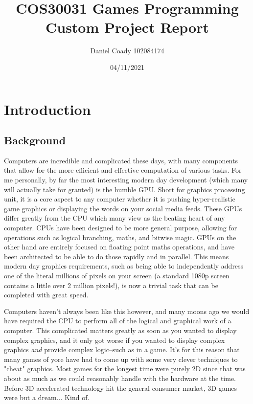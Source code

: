\documentclass{article}
\title{COS30031 Games Programming\\Custom Project Report}
\author{Daniel Coady 102084174}
\date{04/11/2021}
\begin{document}
\maketitle

\pagebreak

\tableofcontents

\pagebreak

\section{Introduction}
\subsection{Background}
Computers are incredible and complicated these days, with many components that
allow for the more efficient and effective computation of various tasks. For me
personally, by far the most interesting modern day development (which many will
actually take for granted) is the humble GPU. Short for graphics processing
unit, it is a core aspect to any computer whether it is pushing hyper-realistic
game graphics or displaying the words on your social media feeds. These GPUs
differ greatly from the CPU which many view as the beating heart of any
computer. CPUs have been designed to be more general purpose, allowing for
operations such as logical branching, maths, and bitwise magic. GPUs on the
other hand are entirely focused on floating point maths operations, and have
been architected to be able to do those rapidly and in parallel. This means
modern day graphics requirements, such as being able to independently address
one of the literal millions of pixels on your screen (a standard 1080p screen
contains a little over 2 million pixels!), is now a trivial task that can be
completed with great speed.

Computers haven't always been like this however, and many moons ago we would
have required the CPU to perform all of the logical and graphical work of a
computer. This complicated matters greatly as soon as you wanted to display
complex graphics, and it only got worse if you wanted to display complex
graphics \textit{and} provide complex logic--such as in a game. It's for this
reason that many games of yore have had to come up with some very clever
techniques to "cheat" graphics. Most games for the longest time were purely 2D
since that was about as much as we could reasonably handle with the hardware
at the time. Before 3D accelerated technology hit the general consumer market,
3D games were but a dream... Kind of.
\end{document}
